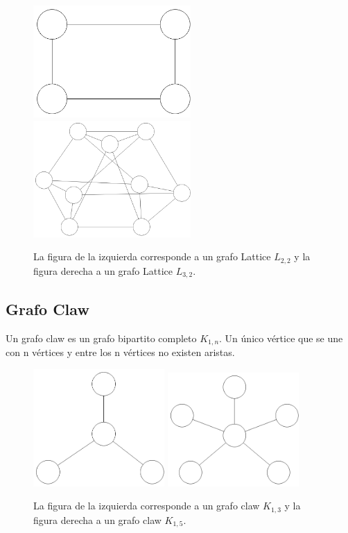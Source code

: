 \begin{figure}[H]
\centering
\includegraphics[width=60mm]{L2_2.png}
\includegraphics[width=60mm]{L3_3.png}
\caption{La figura de la izquierda corresponde a un grafo Lattice $L_{2,2}$ y la figura derecha a un grafo Lattice $L_{3,2}$.}
\label{overflow}
\end{figure}

\subsection{Grafo Claw}
Un grafo claw es un grafo bipartito completo $K_{1,n}$. Un único vértice que se une con n vértices y entre los n vértices no existen aristas.

\begin{figure}[H]
\centering
\includegraphics[width=50mm]{K1_3.png}
\includegraphics[width=50mm]{K1_5.png}
\caption{La figura de la izquierda corresponde a un grafo claw $K_{1,3}$ y la figura derecha a un grafo claw $K_{1,5}$.}
\label{overflow}
\end{figure}

